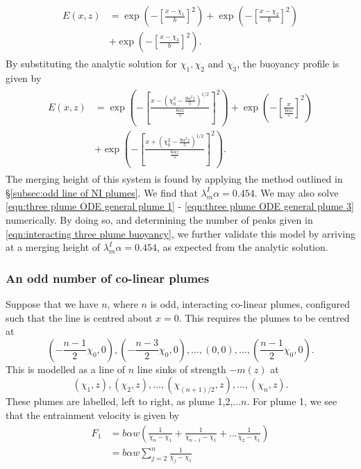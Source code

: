 \documentclass{jfm}
\begin{document}
	\begin{eqnarray}
	\begin{split}
	E(x,z) &= \exp\left(- \left[\frac{x - \chi_1}{b}\right]^2 \right) + \exp\left(- \left[\frac{x - \chi_2}{b}\right]^2\right) \\
	&+ \exp\left(- \left[\frac{x - \chi_3}{b}\right]^2\right).
	\end{split} \label{eqn:interacting three plume buoyancy}
	\end{eqnarray}
	By substituting the analytic solution for $\chi_1,\chi_2$ and $\chi_3$, the buoyancy profile is given by		
	\begin{eqnarray}
	\begin{split}
	E(x,z) &= \exp\left(- \left[\frac{x - (\chi_0^2 - \frac{9\alpha^2z}{5})^{1/2}}{\frac{6\alpha z}{5}}\right]^2 \right) + \exp\left(- \left[\frac{x}{\frac{6\alpha z}{5}}\right]^2\right) \\
	&+ \exp\left(- \left[\frac{x + (\chi_0^2 - \frac{9\alpha^2z}{5} )^{1/2}}{\frac{6\alpha z}{5}}\right]^2\right).\label{eqn:three plume interacting buoyancy profile}
	\end{split}
	\end{eqnarray}	
	The merging height of this system is found by applying the method outlined in \S\ref{subsec:odd line of NI plumes}. We find that $\lambda_m^I \alpha = 0.454$. We may also solve \eqref{eqn:three plume ODE general plume 1} - \eqref{eqn:three plume ODE general plume 3} numerically. By doing so, and determining the number of peaks given in \eqref{eqn:interacting three plume buoyancy}, we further validate this model by arriving at a merging height of $\lambda_m^I\alpha = 0.454$, as expected from the analytic solution.
	
	\subsubsection{An odd number of co-linear plumes}
	Suppose that we have $n$, where $n$ is odd, interacting co-linear plumes, configured such that the line is centred about $x = 0$. This requires the plumes to be centred at 
	$$\left(-\dfrac{n-1}{2}\chi_0,0\right), \left(-\dfrac{n-3}{2}\chi_0,0\right), \dots, (0,0), \dots, \left(\dfrac{n-1}{2}\chi_0,0\right). $$
	This is modelled as a line of $n$ line sinks of strength $-m(z)$ at 
	$$\left(\chi_1,z\right), \left(\chi_2,z\right), \dots, \left(\chi_{(n+1)/2},z\right), \dots, \left(\chi_n,z\right).$$
	These plumes are labelled, left to right, as plume 1,2,...$n$. For plume 1, we see that the entrainment velocity is given by 
	\begin{align}
	F_1 &= \displaystyle{b\alpha w \left( \frac{1}{\chi_n - \chi_1} + \frac{1}{\chi_{n-1} - \chi_1} + \dots \frac{1}{\chi_2 - \chi_1}\right)}\\
	&= b\alpha w \displaystyle{\sum_{j=2}^{n} \frac{1}{\chi_j - \chi_1}}
	\end{align}
	
\end{document}
